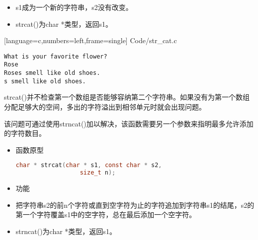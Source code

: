 \begin{frame}[fragile] 
  \begin{itemize}
    \item
      {\tf s1}成为一个新的字符串，{\tf s2}没有改变。\\[0.1in]
    \item 
      {\tf strcat()}为{\tf char *}类型，返回{\tf s1}。
    \end{itemize}
\end{frame}

\begin{frame}

[language=c,numbers=left,frame=single]
{Code/str_cat.c}
\end{frame}

\begin{frame}[fragile]
\begin{lstlisting}[backgroundcolor=\color{blue!20}]
What is your favorite flower?
Rose
Roses smell like old shoes.
s smell like old shoes.
\end{lstlisting}
\end{frame}

\begin{frame}[fragile] 
{\tf strcat()}并不检查第一个数组是否能够容纳第二个字符串。如果没有为第一个数组分配足够大的空间，多出的字符溢出到相邻单元时就会出现问题。\vspace{.1in}

该问题可通过使用{\tf strncat()}加以解决，该函数需要另一个参数来指明最多允许添加的字符数目。


\end{frame}

\begin{frame}[fragile]
  \begin{itemize}
  \item \textcolor{acolor1}{函数原型}
    \begin{lstlisting}[language=c,backgroundcolor=\color{red!20}]
    char * strcat(char * s1, const char * s2,
                  size_t n);
    \end{lstlisting}
  \item 
    \textcolor{acolor1}{功能}
  \item[]
    把字符串{\tf s2}的前{\tf n}个字符或直到空字符为止的字符追加到字符串{\tf s1}的结尾，{\tf s2}的第一个字符覆盖{\tf s1}中的空字符，总在最后添加一个空字符。\\[0.1in]
  \item
    {\tf strncat()}为{\tf char *}类型，返回{\tf s1}。
  \end{itemize}
\end{frame}


